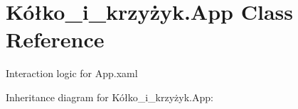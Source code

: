 \hypertarget{class_k_xC3_xB3_xC5_x82ko__i__krzy_xC5_xBCyk_1_1_app}{}\section{Kółko\+\_\+i\+\_\+krzyżyk.\+App Class Reference}
\label{class_k_xC3_xB3_xC5_x82ko__i__krzy_xC5_xBCyk_1_1_app}


Interaction logic for App.\+xaml  




Inheritance diagram for Kółko\+\_\+i\+\_\+krzyżyk.\+App\+:
